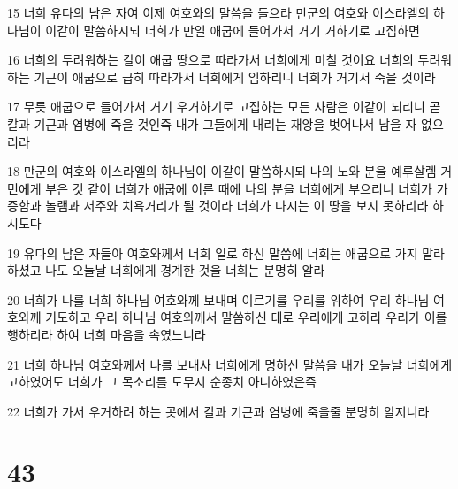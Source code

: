 \par 15 너희 유다의 남은 자여 이제 여호와의 말씀을 들으라 만군의 여호와 이스라엘의 하나님이 이같이 말씀하시되 너희가 만일 애굽에 들어가서 거기 거하기로 고집하면
\par 16 너희의 두려워하는 칼이 애굽 땅으로 따라가서 너희에게 미칠 것이요 너희의 두려워하는 기근이 애굽으로 급히 따라가서 너희에게 임하리니 너희가 거기서 죽을 것이라
\par 17 무릇 애굽으로 들어가서 거기 우거하기로 고집하는 모든 사람은 이같이 되리니 곧 칼과 기근과 염병에 죽을 것인즉 내가 그들에게 내리는 재앙을 벗어나서 남을 자 없으리라
\par 18 만군의 여호와 이스라엘의 하나님이 이같이 말씀하시되 나의 노와 분을 예루살렘 거민에게 부은 것 같이 너희가 애굽에 이른 때에 나의 분을 너희에게 부으리니 너희가 가증함과 놀램과 저주와 치욕거리가 될 것이라 너희가 다시는 이 땅을 보지 못하리라 하시도다
\par 19 유다의 남은 자들아 여호와께서 너희 일로 하신 말씀에 너희는 애굽으로 가지 말라 하셨고 나도 오늘날 너희에게 경계한 것을 너희는 분명히 알라
\par 20 너희가 나를 너희 하나님 여호와께 보내며 이르기를 우리를 위하여 우리 하나님 여호와께 기도하고 우리 하나님 여호와께서 말씀하신 대로 우리에게 고하라 우리가 이를 행하리라 하여 너희 마음을 속였느니라
\par 21 너희 하나님 여호와께서 나를 보내사 너희에게 명하신 말씀을 내가 오늘날 너희에게 고하였어도 너희가 그 목소리를 도무지 순종치 아니하였은즉
\par 22 너희가 가서 우거하려 하는 곳에서 칼과 기근과 염병에 죽을줄 분명히 알지니라

\chapter{43}

